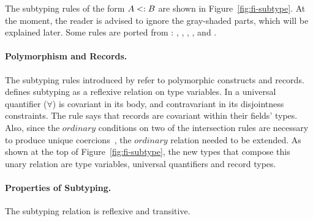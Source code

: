 The subtyping rules of the form $A <: B$ are shown in 
Figure~\ref{fig:fi-subtype}. 
At the moment, the reader is advised to ignore the
gray-shaded parts, which will be explained later. 
Some rules are ported from \oldname: , 
,
, ,  and
.


\paragraph{Polymorphism and Records.}
The subtyping rules introduced by \name refer to polymorphic constructs and records. 
 defines subtyping as a reflexive relation on type variables.
In  a universal quantifier ($\forall$) 
is covariant in its body, and contravariant in its disjointness constraints.
The  rule says that records are covariant within their fields' types.
Also, since the $ordinary$ conditions on two of the intersection rules are necessary to 
produce unique coercions~\cite{oliveira16disjoint}, the $ordinary$ relation needed to be extended.
As shown at the top of Figure~\ref{fig:fi-subtype}, the new types that compose this unary 
relation are type variables, universal quantifiers and record types.

\paragraph{Properties of Subtyping.} The subtyping relation is reflexive and transitive.

